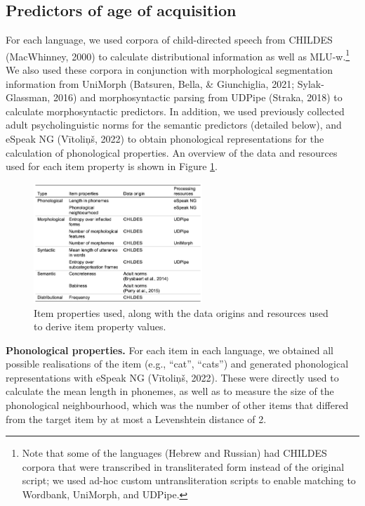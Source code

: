 \documentclass[10pt, letterpaper]{article}
\newenvironment{CodeChunk}{}{}
\begin{document}
\hypertarget{predictors-of-age-of-acquisition}{%
\subsection{Predictors of age of
acquisition}\label{predictors-of-age-of-acquisition}}

For each language, we used corpora of child-directed speech from CHILDES
(MacWhinney, 2000) to calculate distributional information as well as
MLU-w.\footnote{Note that some of the languages (Hebrew and Russian) had
  CHILDES corpora that were transcribed in transliterated form instead
  of the original script; we used ad-hoc custom untransliteration
  scripts to enable matching to Wordbank, UniMorph, and UDPipe.} We also
used these corpora in conjunction with morphological segmentation
information from UniMorph (Batsuren, Bella, \& Giunchiglia, 2021;
Sylak-Glassman, 2016) and morphosyntactic parsing from UDPipe (Straka,
2018) to calculate morphosyntactic predictors. In addition, we used
previously collected adult psycholinguistic norms for the semantic
predictors (detailed below), and eSpeak NG (Vītoliņš, 2022) to obtain
phonological representations for the calculation of phonological
properties. An overview of the data and resources used for each item
property is shown in Figure \ref{fig:sources}.

\begin{CodeChunk}
\begin{figure}[ht]

{\centering \includegraphics[width=240px]{figs/sources} 

}

\caption[Item properties used, along with the data origins and resources used to derive item property values]{Item properties used, along with the data origins and resources used to derive item property values.}\label{fig:sources}
\end{figure}
\end{CodeChunk}

\textbf{Phonological properties.} For each item in each language, we
obtained all possible realisations of the item (e.g., ``cat'', ``cats'')
and generated phonological representations with eSpeak NG (Vītoliņš,
2022). These were directly used to calculate the mean length in
phonemes, as well as to measure the size of the phonological
neighbourhood, which was the number of other items that differed from
the target item by at most a Levenshtein distance of 2.
\end{document}
